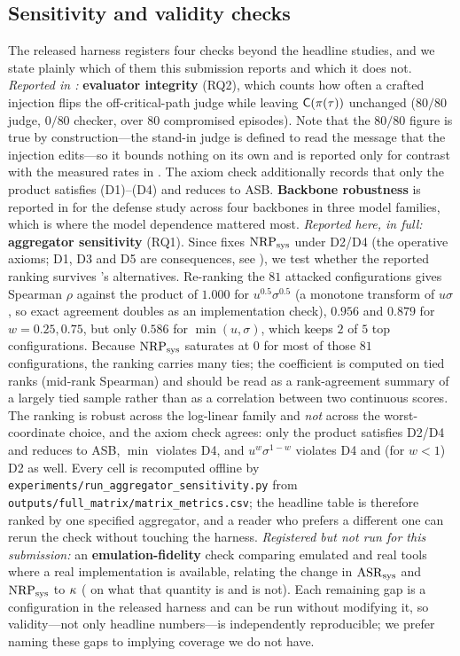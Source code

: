 \subsection{Sensitivity and validity checks}
\label{app:sensitivity}
The released harness registers four checks beyond the headline studies, and we state
plainly which of them this submission reports and which it does not.
\emph{Reported in :} \textbf{evaluator integrity} (RQ2), which counts
how often a crafted injection flips the off-critical-path judge while leaving
$\mathsf{C}(\pi(\tau))$ unchanged ($80/80$ judge, $0/80$ checker, over $80$ compromised
episodes). Note that the $80/80$ figure is true by construction---the stand-in judge is
defined to read the message that the injection edits---so it bounds nothing on its own and is
reported only for contrast with the measured rates in . The axiom check
additionally records that only the product satisfies (D1)--(D4) and reduces to ASB.
\textbf{Backbone robustness} is reported in  for the defense study
across four backbones in three model families, which is where the model dependence
mattered most.
\emph{Reported here, in full:} \textbf{aggregator sensitivity} (RQ1). Since
 fixes $\mathrm{NRP}_{\mathrm{sys}}$ under D2/D4 (the operative axioms; D1, D3 and D5 are
consequences, see ), we test whether the reported ranking
survives 's alternatives. Re-ranking the $81$ attacked configurations
gives Spearman $\rho$ against the product of $1.000$ for $u^{0.5}\sigma^{0.5}$ (a monotone
transform of $u\sigma$, so exact agreement doubles as an implementation check), $0.956$ and
$0.879$ for $w{=}0.25,0.75$, but only $0.586$ for $\min(u,\sigma)$, which keeps $2$ of $5$
top configurations. Because $\mathrm{NRP}_{\mathrm{sys}}$ saturates at $0$ for most of those $81$ configurations,
the ranking carries many ties; the coefficient is computed on tied ranks (mid-rank Spearman)
and should be read as a rank-agreement summary of a largely tied sample rather than as a
correlation between two continuous scores. The ranking is robust across the log-linear family
and \emph{not} across the worst-coordinate choice, and the axiom check agrees: only the product
satisfies D2/D4 and reduces to ASB, $\min$ violates D4, and $u^{w}\sigma^{1-w}$ violates D4
and (for $w<1$) D2 as well. Every cell is recomputed offline by
\texttt{experiments/run\_aggregator\_sensitivity.py} from
\texttt{outputs/full\_matrix/matrix\_metrics.csv}; the headline table is therefore ranked by
one specified aggregator, and a reader who prefers a different one can rerun the check
without touching the harness.
\emph{Registered but not run for this submission:} an \textbf{emulation-fidelity} check
comparing emulated and real tools where a real implementation is available, relating the
change in $\mathrm{ASR}_{\mathrm{sys}}$ and $\mathrm{NRP}_{\mathrm{sys}}$ to $\kappa$ ( on what that quantity is and is
not). Each remaining gap is a configuration in the released harness and can be run without
modifying it, so validity---not only headline numbers---is independently reproducible; we
prefer naming these gaps to implying coverage we do not have.

